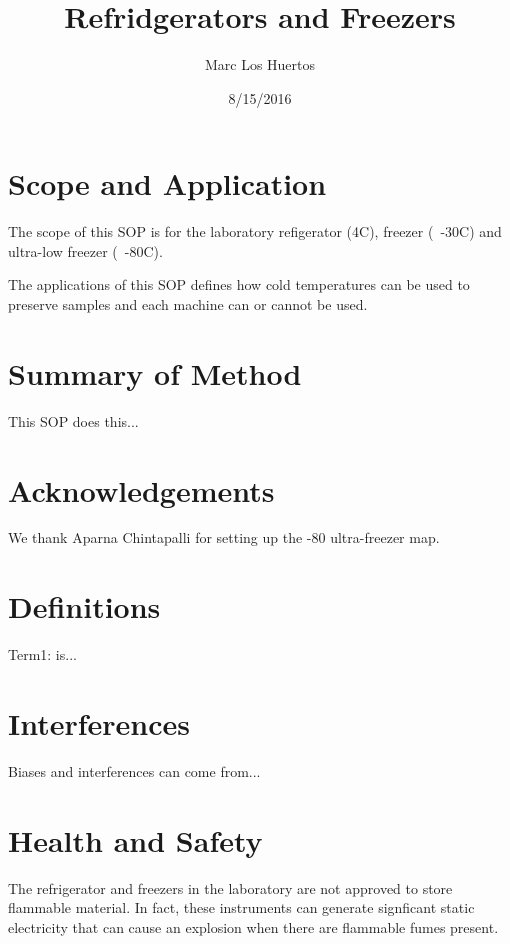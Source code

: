 \documentclass[12pt]{../SOP3_alpha}\usepackage[]{graphicx}\usepackage[]{xcolor}
\title{Refridgerators and Freezers}
\date{8/15/2016}
\author{Marc Los Huertos}
\begin{document}

\maketitle

\section{Scope and Application}

\NP The scope of this SOP is for the laboratory refigerator (4\degree C), freezer (~-30\degree C) and ultra-low freezer (~-80\degree C).

\NP The applications of this SOP defines how cold temperatures can be used to preserve samples and each machine can or cannot be used.

\section{Summary of Method}

\NP This SOP does this...

\tableofcontents

\newpage

\section{Acknowledgements}

We thank Aparna Chintapalli for setting up the -80 ultra-freezer map.

\section{Definitions}

\NP Term1: is...

\section{Interferences}

\NP Biases and interferences can come from...

\section{Health and Safety}

\NP The refrigerator and freezers in the laboratory are not approved to store flammable material. In fact, these instruments can generate signficant static electricity that can cause an explosion when there are flammable fumes present. 
\end{document}
